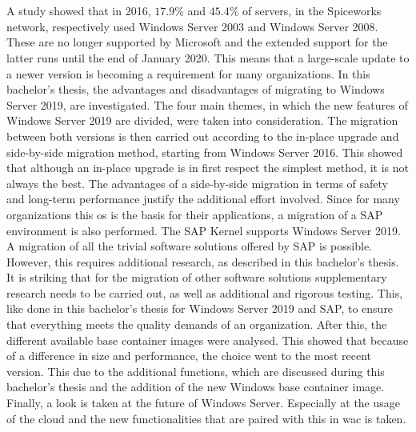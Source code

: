 \chapter*{}
A study showed that in 2016, {$17.9$}\% and {$45.4$}\% of servers, in the Spiceworks network, respectively used Windows Server 2003 and Windows Server 2008. \autocite{Tsai2016} 
These are no longer supported by Microsoft and the extended support for the latter runs until the end of January 2020. 
This means that a large-scale update to a newer version is becoming a requirement for many organizations. 
In this bachelor's thesis, the advantages and disadvantages of migrating to Windows Server 2019, are investigated. 
The four main themes, in which the new features of Windows Server 2019 are divided, were taken into consideration. 
The migration between both versions is then carried out according to the in-place upgrade and side-by-side migration method, starting from Windows Server 2016. 
This showed that although an in-place upgrade is in first respect the simplest method, it is not always the best. 
The advantages of a side-by-side migration in terms of safety and long-term performance justify the additional effort involved.
Since for many organizations this \acrshort{os} is the basis for their applications, a migration of a SAP environment is also performed. 
The SAP Kernel supports Windows Server 2019. 
A migration of all the trivial software solutions offered by SAP is possible.
However, this requires additional research, as described in this bachelor's thesis.
It is striking that for the migration of other software solutions supplementary research needs to be carried out, as well as additional and rigorous testing. 
This, like done in this bachelor's thesis for Windows Server 2019 and SAP, to ensure that everything meets the quality demands of an organization.
After this, the different available base container images were analysed. 
This showed that because of a difference in size and performance, the choice went to the most recent version. 
This due to the additional functions, which are discussed during this bachelor's thesis and the addition of the new Windows base container image.
Finally, a look is taken at the future of Windows Server. 
Especially at the usage of the cloud and the new functionalities that are paired with this in \acrlong{wac} is taken. 
